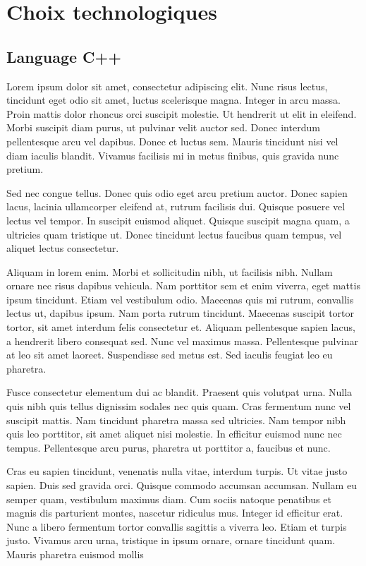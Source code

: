 \documentclass{report}
\begin{document}
    \chapter{Choix technologiques}
        \section{Language C++}
            Lorem ipsum dolor sit amet, consectetur adipiscing elit. Nunc risus lectus, tincidunt eget odio sit amet, luctus scelerisque magna. Integer in arcu massa. Proin mattis dolor rhoncus orci suscipit molestie. Ut hendrerit ut elit in eleifend. Morbi suscipit diam purus, ut pulvinar velit auctor sed. Donec interdum pellentesque arcu vel dapibus. Donec et luctus sem. Mauris tincidunt nisi vel diam iaculis blandit. Vivamus facilisis mi in metus finibus, quis gravida nunc pretium.

            Sed nec congue tellus. Donec quis odio eget arcu pretium auctor. Donec sapien lacus, lacinia ullamcorper eleifend at, rutrum facilisis dui. Quisque posuere vel lectus vel tempor. In suscipit euismod aliquet. Quisque suscipit magna quam, a ultricies quam tristique ut. Donec tincidunt lectus faucibus quam tempus, vel aliquet lectus consectetur.

            Aliquam in lorem enim. Morbi et sollicitudin nibh, ut facilisis nibh. Nullam ornare nec risus dapibus vehicula. Nam porttitor sem et enim viverra, eget mattis ipsum tincidunt. Etiam vel vestibulum odio. Maecenas quis mi rutrum, convallis lectus ut, dapibus ipsum. Nam porta rutrum tincidunt. Maecenas suscipit tortor tortor, sit amet interdum felis consectetur et. Aliquam pellentesque sapien lacus, a hendrerit libero consequat sed. Nunc vel maximus massa. Pellentesque pulvinar at leo sit amet laoreet. Suspendisse sed metus est. Sed iaculis feugiat leo eu pharetra.

            Fusce consectetur elementum dui ac blandit. Praesent quis volutpat urna. Nulla quis nibh quis tellus dignissim sodales nec quis quam. Cras fermentum nunc vel suscipit mattis. Nam tincidunt pharetra massa sed ultricies. Nam tempor nibh quis leo porttitor, sit amet aliquet nisi molestie. In efficitur euismod nunc nec tempus. Pellentesque arcu purus, pharetra ut porttitor a, faucibus et nunc.

            Cras eu sapien tincidunt, venenatis nulla vitae, interdum turpis. Ut vitae justo sapien. Duis sed gravida orci. Quisque commodo accumsan accumsan. Nullam eu semper quam, vestibulum maximus diam. Cum sociis natoque penatibus et magnis dis parturient montes, nascetur ridiculus mus. Integer id efficitur erat. Nunc a libero fermentum tortor convallis sagittis a viverra leo. Etiam et turpis justo. Vivamus arcu urna, tristique in ipsum ornare, ornare tincidunt quam. Mauris pharetra euismod mollis
\end{document}
